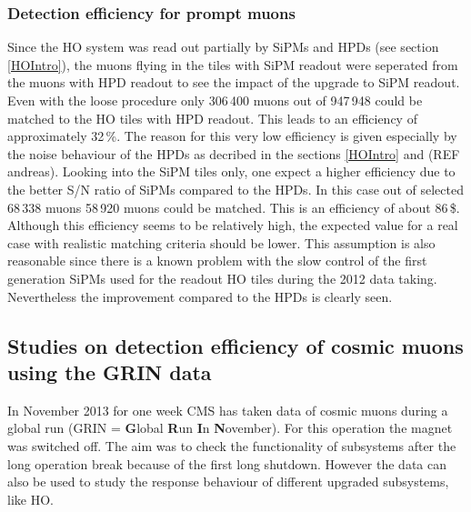 		\subsubsection{Detection efficiency for prompt muons}
			Since the HO system was read out partially by SiPMs and HPDs (see section \ref{HOIntro}), the muons flying in the tiles with SiPM readout were seperated from the muons with HPD readout to see
			the impact of the upgrade to SiPM readout.
			Even with the loose procedure only 306\,400 muons out of 947\,948 could be matched to the HO tiles with HPD readout.
			This leads to an efficiency of approximately 32\,\%.
			The reason for this very low efficiency is given especially by the noise behaviour of the HPDs as decribed in the sections \ref{HOIntro} and (REF andreas).
			Looking into the SiPM tiles only, one expect a higher efficiency due to the better S/N ratio of SiPMs compared to the HPDs.
			In this case out of selected 68\,338 muons 58\,920 muons could be matched.
			This is an efficiency of about 86\,\$.
			Although this efficiency seems to be relatively high, the expected value for a real case with realistic matching criteria should be lower.
			This assumption is also reasonable since there is a known problem with the slow control of the first generation SiPMs used for the readout HO tiles during the 2012 data taking.
			Nevertheless the improvement compared to the HPDs is clearly seen.
	\subsection{Studies on detection efficiency of cosmic muons using the GRIN data} 
		In November 2013 for one week CMS has taken data of cosmic muons during a global run (GRIN = \textbf{G}lobal \textbf{R}un \textbf{I}n \textbf{N}ovember).
		For this operation the magnet was switched off.
		The aim was to check the functionality of subsystems after the long operation break because of the first long shutdown.
		However the data can also be used to study the response behaviour of different upgraded subsystems, like HO.
